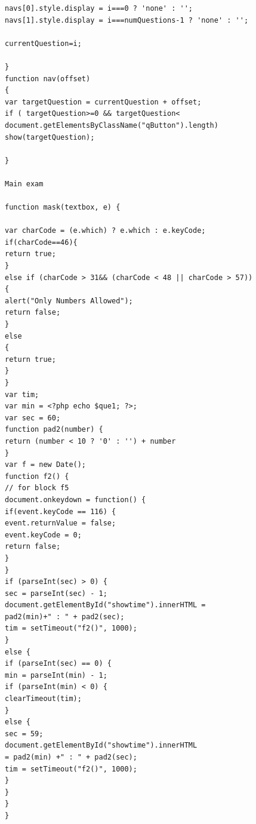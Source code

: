 \begin{verbatim}
navs[0].style.display = i===0 ? 'none' : '';
navs[1].style.display = i===numQuestions-1 ? 'none' : '';

currentQuestion=i;

}
function nav(offset)
{
var targetQuestion = currentQuestion + offset;
if ( targetQuestion>=0 && targetQuestion<
document.getElementsByClassName("qButton").length)
show(targetQuestion);

}

Main exam

function mask(textbox, e) {

var charCode = (e.which) ? e.which : e.keyCode;
if(charCode==46){
return true;
}
else if (charCode > 31&& (charCode < 48 || charCode > 57)) 
{
alert("Only Numbers Allowed");
return false;
}
else
{
return true;
}
}
var tim;       
var min = <?php echo $que1; ?>;
var sec = 60;
function pad2(number) {
return (number < 10 ? '0' : '') + number
}
var f = new Date();
function f2() {
// for block f5
document.onkeydown = function() {
if(event.keyCode == 116) {
event.returnValue = false;
event.keyCode = 0;
return false;
}
}
if (parseInt(sec) > 0) {
sec = parseInt(sec) - 1;
document.getElementById("showtime").innerHTML = 
pad2(min)+" : " + pad2(sec);
tim = setTimeout("f2()", 1000);
}
else {
if (parseInt(sec) == 0) {
min = parseInt(min) - 1;
if (parseInt(min) < 0) {
clearTimeout(tim);
}
else {
sec = 59;
document.getElementById("showtime").innerHTML 
= pad2(min) +" : " + pad2(sec);
tim = setTimeout("f2()", 1000);
}
}
}
}
\end{verbatim}

